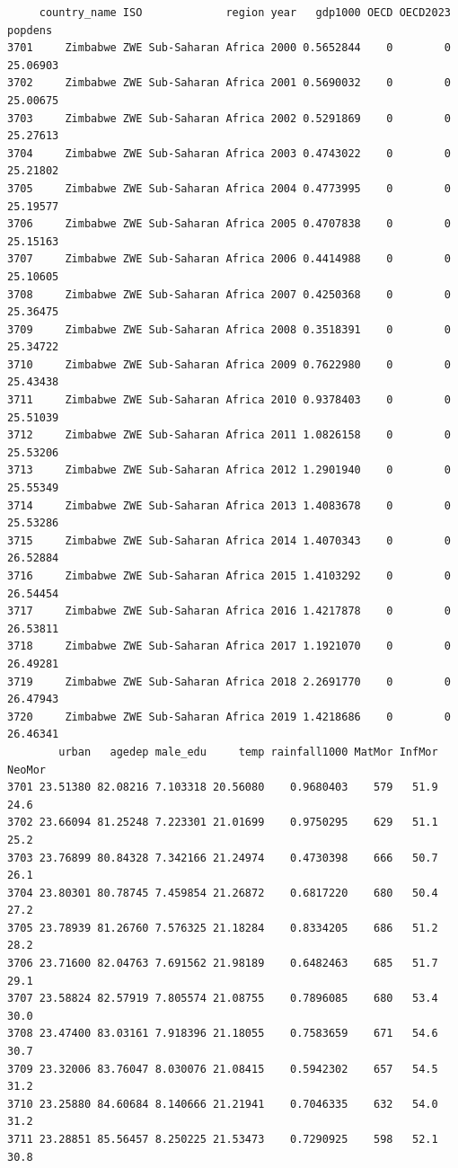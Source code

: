 \documentclass[
  11pt,
  letterpaper,
  DIV=11,
  numbers=noendperiod]{scrartcl}
\begin{document}
\begin{verbatim}
     country_name ISO             region year   gdp1000 OECD OECD2023  popdens
3701     Zimbabwe ZWE Sub-Saharan Africa 2000 0.5652844    0        0 25.06903
3702     Zimbabwe ZWE Sub-Saharan Africa 2001 0.5690032    0        0 25.00675
3703     Zimbabwe ZWE Sub-Saharan Africa 2002 0.5291869    0        0 25.27613
3704     Zimbabwe ZWE Sub-Saharan Africa 2003 0.4743022    0        0 25.21802
3705     Zimbabwe ZWE Sub-Saharan Africa 2004 0.4773995    0        0 25.19577
3706     Zimbabwe ZWE Sub-Saharan Africa 2005 0.4707838    0        0 25.15163
3707     Zimbabwe ZWE Sub-Saharan Africa 2006 0.4414988    0        0 25.10605
3708     Zimbabwe ZWE Sub-Saharan Africa 2007 0.4250368    0        0 25.36475
3709     Zimbabwe ZWE Sub-Saharan Africa 2008 0.3518391    0        0 25.34722
3710     Zimbabwe ZWE Sub-Saharan Africa 2009 0.7622980    0        0 25.43438
3711     Zimbabwe ZWE Sub-Saharan Africa 2010 0.9378403    0        0 25.51039
3712     Zimbabwe ZWE Sub-Saharan Africa 2011 1.0826158    0        0 25.53206
3713     Zimbabwe ZWE Sub-Saharan Africa 2012 1.2901940    0        0 25.55349
3714     Zimbabwe ZWE Sub-Saharan Africa 2013 1.4083678    0        0 25.53286
3715     Zimbabwe ZWE Sub-Saharan Africa 2014 1.4070343    0        0 26.52884
3716     Zimbabwe ZWE Sub-Saharan Africa 2015 1.4103292    0        0 26.54454
3717     Zimbabwe ZWE Sub-Saharan Africa 2016 1.4217878    0        0 26.53811
3718     Zimbabwe ZWE Sub-Saharan Africa 2017 1.1921070    0        0 26.49281
3719     Zimbabwe ZWE Sub-Saharan Africa 2018 2.2691770    0        0 26.47943
3720     Zimbabwe ZWE Sub-Saharan Africa 2019 1.4218686    0        0 26.46341
        urban   agedep male_edu     temp rainfall1000 MatMor InfMor NeoMor
3701 23.51380 82.08216 7.103318 20.56080    0.9680403    579   51.9   24.6
3702 23.66094 81.25248 7.223301 21.01699    0.9750295    629   51.1   25.2
3703 23.76899 80.84328 7.342166 21.24974    0.4730398    666   50.7   26.1
3704 23.80301 80.78745 7.459854 21.26872    0.6817220    680   50.4   27.2
3705 23.78939 81.26760 7.576325 21.18284    0.8334205    686   51.2   28.2
3706 23.71600 82.04763 7.691562 21.98189    0.6482463    685   51.7   29.1
3707 23.58824 82.57919 7.805574 21.08755    0.7896085    680   53.4   30.0
3708 23.47400 83.03161 7.918396 21.18055    0.7583659    671   54.6   30.7
3709 23.32006 83.76047 8.030076 21.08415    0.5942302    657   54.5   31.2
3710 23.25880 84.60684 8.140666 21.21941    0.7046335    632   54.0   31.2
3711 23.28851 85.56457 8.250225 21.53473    0.7290925    598   52.1   30.8

\end{verbatim}
\end{document}
